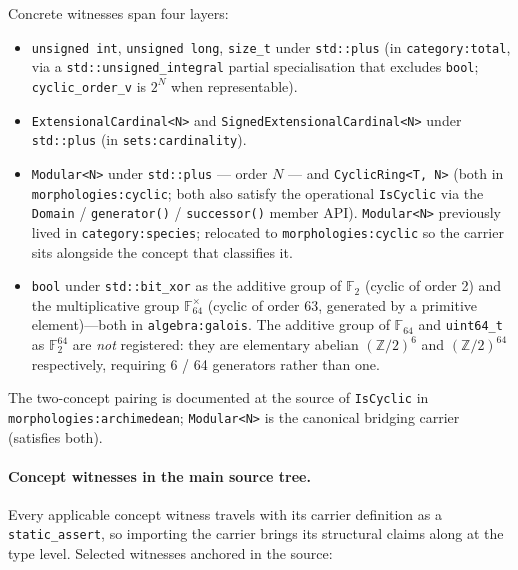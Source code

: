 \documentclass[11pt, a4paper]{report}
\begin{document}
Concrete witnesses span four layers:

\begin{itemize}
  \item \texttt{unsigned int}, \texttt{unsigned long}, \texttt{size\_t} under \texttt{std::plus} (in \texttt{category:total}, via a \texttt{std::unsigned\_integral} partial specialisation that excludes \texttt{bool}; \texttt{cyclic\_order\_v} is $2^N$ when representable).
  \item \texttt{ExtensionalCardinal<N>} and \texttt{SignedExtensionalCardinal<N>} under \texttt{std::plus} (in \texttt{sets:cardinality}).
  \item \texttt{Modular<N>} under \texttt{std::plus} — order $N$ — and \texttt{CyclicRing<T, N>} (both in \texttt{morphologies:cyclic}; both also satisfy the operational \texttt{IsCyclic} via the \texttt{Domain} / \texttt{generator()} / \texttt{successor()} member API). \texttt{Modular<N>} previously lived in \texttt{category:species}; relocated to \texttt{morphologies:cyclic} so the carrier sits alongside the concept that classifies it.
  \item \texttt{bool} under \texttt{std::bit\_xor} as the additive group of $\mathbb{F}_2$ (cyclic of order 2) and the multiplicative group $\mathbb{F}_{64}^{\times}$ (cyclic of order 63, generated by a primitive element)---both in \texttt{algebra:galois}. The additive group of $\mathbb{F}_{64}$ and \texttt{uint64\_t} as $\mathbb{F}_2^{64}$ are \emph{not} registered: they are elementary abelian $(\mathbb{Z}/2)^6$ and $(\mathbb{Z}/2)^{64}$ respectively, requiring 6 / 64 generators rather than one.
\end{itemize}

The two-concept pairing is documented at the source of \texttt{IsCyclic} in \texttt{morphologies:archimedean}; \texttt{Modular<N>} is the canonical bridging carrier (satisfies both).

\paragraph{Concept witnesses in the main source tree.}
Every applicable concept witness travels with its carrier definition as a \texttt{static\_assert}, so importing the carrier brings its structural claims along at the type level. Selected witnesses anchored in the source:
\end{document}
